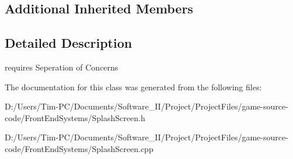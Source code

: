 \subsection*{Additional Inherited Members}


\subsection{Detailed Description}
requires Seperation of Concerns 

The documentation for this class was generated from the following files\+:\begin{DoxyCompactItemize}
\item 
D\+:/\+Users/\+Tim-\/\+P\+C/\+Documents/\+Software\+\_\+\+I\+I/\+Project/\+Project\+Files/game-\/source-\/code/\+Front\+End\+Systems/Splash\+Screen.\+h\item 
D\+:/\+Users/\+Tim-\/\+P\+C/\+Documents/\+Software\+\_\+\+I\+I/\+Project/\+Project\+Files/game-\/source-\/code/\+Front\+End\+Systems/Splash\+Screen.\+cpp\end{DoxyCompactItemize}
